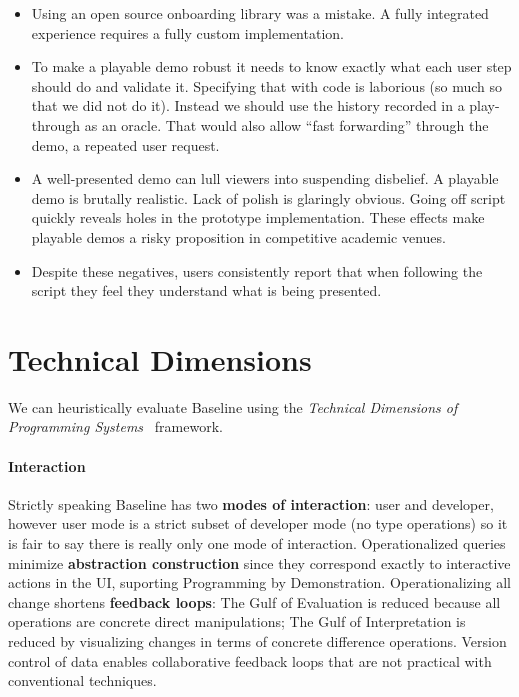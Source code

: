 \documentclass[english,submission]{programming}
\theoremstyle{definition}
\begin{document}
\begin{itemize}
\item Using an open source onboarding library was a mistake. A fully integrated experience requires a fully custom implementation.
\item To make a playable demo robust it needs to know exactly what each user step should do and validate it. Specifying that with code is laborious (so much so that we did not do it). Instead we should use the history recorded in a play-through as an oracle. That would also allow ``fast forwarding'' through the demo, a repeated user request.
\item A well-presented demo can lull viewers into suspending disbelief. A playable demo is brutally realistic. Lack of polish is glaringly obvious. Going off script quickly reveals holes in the prototype implementation. These effects make playable demos a risky proposition in competitive academic venues.
\item Despite these negatives, users consistently report that when following the script they feel they understand what is being presented.

\end{itemize}




\section{Technical Dimensions}\label{tech-dims}
We can heuristically evaluate Baseline using the \textit{Technical Dimensions of Programming Systems}~\cite{techdims} framework.

\paragraph{Interaction} Strictly speaking Baseline has two \textbf{modes of interaction}: user and developer, however user mode is a strict subset of developer mode (no type operations) so it is fair to say there is really only one mode of interaction.
Operationalized queries minimize \textbf{abstraction construction} since they correspond exactly to interactive actions in the UI, suporting Programming by Demonstration.
Operationalizing all change shortens \textbf{feedback loops}: The Gulf of Evaluation is reduced because all operations are concrete direct manipulations; The Gulf of Interpretation is reduced by visualizing changes in terms of concrete difference operations. Version control of data enables collaborative feedback loops that are not practical with conventional techniques.
\end{document}
